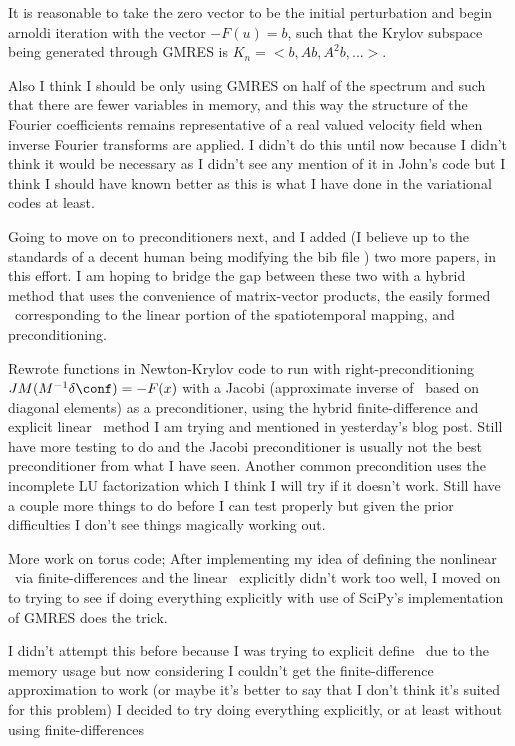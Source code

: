 It is reasonable
to take the zero vector to be the initial perturbation and begin arnoldi iteration
with the vector $-F(u) = b$, such that the Krylov subspace being generated through
GMRES is $K_n = <b, Ab, A^2b, ...>$.

Also I think I should be only using GMRES on half of the spectrum and such that there
are fewer variables in memory, and this way the structure of the Fourier coefficients
remains representative of a real valued velocity field when inverse Fourier transforms
are applied. I didn't do this until now because I didn't think it would be necessary
as I didn't see any mention of it in John's code but I think I should have known better
as this is what I have done in the variational codes at least.

Going to move on to preconditioners next, and I added (I believe up to the standards
of a decent human being modifying the bib file ) two more papers,  in this effort.
I am hoping to bridge the gap between these two with a hybrid method that uses the convenience of matrix-vector
products, the easily formed \jacobianM\ corresponding to the linear portion of the spatiotemporal mapping, and
preconditioning.

Rewrote functions in Newton-Krylov code to run with right-preconditioning
$J M (M^{-1} \delta \conf) = -F(x)$ with a Jacobi (approximate inverse of
\jacobianM\ based on diagonal elements) as a preconditioner, using the
hybrid finite-difference and explicit linear \jacobianM\ method I am trying and mentioned
in yesterday's blog post. Still have more
testing to do and the Jacobi preconditioner is usually not the best preconditioner from what
I have seen. Another common precondition uses the incomplete LU factorization
which I think I will try if it doesn't work.
Still have a couple more things to do before I can test properly but given
the prior difficulties I don't see things magically working out.

More work on torus code; After implementing my idea of defining
the nonlinear \jacobianM\ via finite-differences and the linear \jacobianM\
explicitly didn't work too well, I moved on to trying to see if doing everything
explicitly with use of SciPy's implementation of GMRES does the trick.

I didn't attempt this before because I was trying to explicit define \jacobianMs\
due to the memory usage but now considering I couldn't get the finite-difference
approximation to work (or maybe it's better to say that I don't think it's suited
for this problem) I decided to try doing everything explicitly, or at least
without using finite-differences

